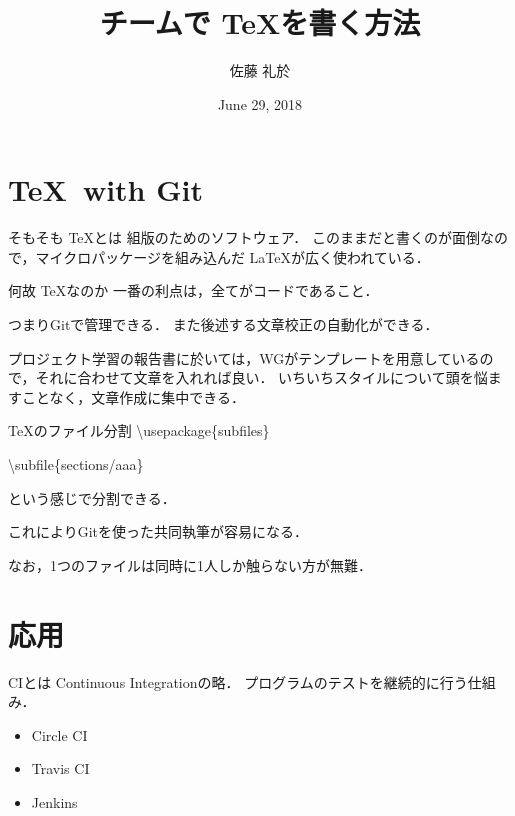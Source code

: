 \documentclass{beamer}
\title{チームで \TeX を書く方法}
\author{佐藤 礼於}
\date{June 29, 2018}
\begin{document}
\frame{\maketitle}

\section{\TeX \ with Git}

\begin{frame}{そもそも \TeX とは}
  組版のためのソフトウェア．
  このままだと書くのが面倒なので，マイクロパッケージを組み込んだ \LaTeX が広く使われている．
\end{frame}

\begin{frame}{何故 \TeX なのか}
  一番の利点は，\alert{全てがコードであること}．

  つまりGitで管理できる．
  また後述する文章校正の自動化ができる．

  プロジェクト学習の報告書に於いては，WGがテンプレートを用意しているので，それに合わせて文章を入れれば良い．
  いちいちスタイルについて頭を悩ますことなく，文章作成に集中できる．
\end{frame}

\begin{frame}{\TeX のファイル分割}
  \textbackslash usepackage\{subfiles\}

  \textbackslash subfile\{sections/aaa\}

  という感じで分割できる．

  これによりGitを使った共同執筆が容易になる．

  なお，1つのファイルは同時に1人しか触らない方が無難．
\end{frame}


\section{応用}

\begin{frame}{CIとは}
  Continuous Integrationの略．
  プログラムのテストを継続的に行う仕組み．

  \begin{itemize}
    \item Circle CI
    \item Travis CI
    \item Jenkins
  \end{itemize}
\end{frame}
\end{document}
